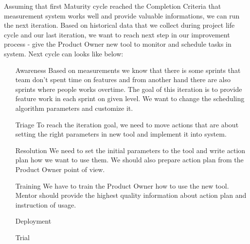 Assuming that first Maturity cycle reached the Completion Criteria that measurement system works well and provide valuable informations, we can run the next iteration. Based on historical data that we collect during project life cycle and our last iteration, we want to reach next step in our improvement process - give the Product Owner new tool to monitor and schedule tasks in system. Next cycle can looks like below:

\begin{enumerate}
\item[Awareness] Based on measurements we know that there is some sprints that team don't spent time on features and from another hand there are also sprints where people works overtime. The goal of this iteration is to provide feature work in each sprint on given level. We want to change the scheduling algorithm parameters and customize it.
\item[Triage] To reach the iteration goal, we need to move actions that are about setting the right parameters in new tool and implement it into system.
\item[Resolution] We need to set the initial parameters to the tool and write action plan how we want to use them. We should also prepare action plan from the Product Owner point of view.
\item[Training] We have to train the Product Owner how to use the new tool. Mentor should provide the highest quality information about action plan and instruction of usage. 
\item[Deployment] 
\item[Trial] 
\end{enumerate}